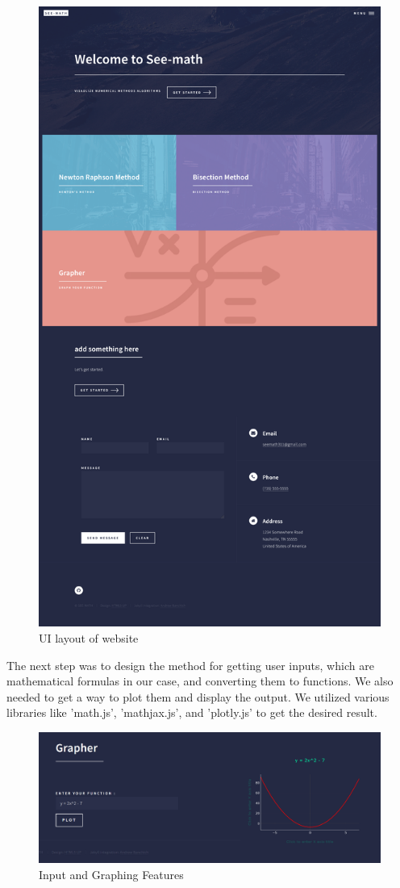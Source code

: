 \begin{figure}[h!]
	\centering
	\includegraphics[width=0.8\linewidth]{seemath1}
	\caption{UI layout of website}
\end{figure}

\pagebreak
The next step was to design the method for getting user inputs, which are mathematical formulas in our case, and converting them to functions. We also needed to get a way to plot them and display the output. We utilized various libraries like 'math.js', 'mathjax.js', and 'plotly.js' to get the desired result.

\begin{figure}[h!]
	\centering
	\includegraphics[width=0.8\linewidth]{seemath3}
	\caption{Input and Graphing Features}
\end{figure}


